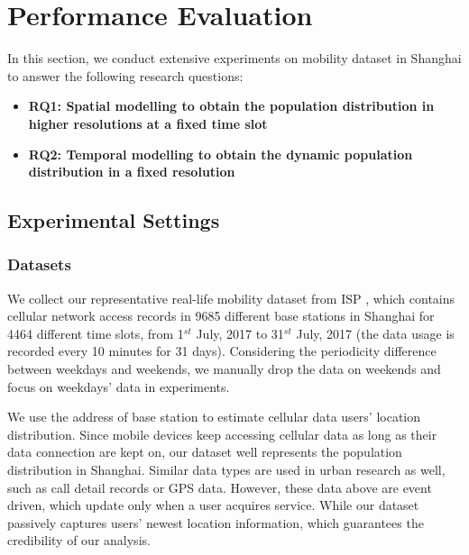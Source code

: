 \documentclass[letterpaper]{article} %
\begin{document}
\section{Performance Evaluation}

In this section, we conduct extensive experiments on mobility dataset in Shanghai to answer the following research questions:

\begin{itemize}

    \item \textbf{RQ1: Spatial modelling to obtain the population distribution in higher resolutions at a fixed time slot} 

    \item \textbf{RQ2: Temporal modelling to obtain the dynamic population distribution in a fixed resolution}

\end{itemize}

\subsection{Experimental Settings}

\subsubsection{Datasets}

We collect our representative real-life mobility dataset from ISP , which contains cellular network access records in 9685 different base stations in Shanghai for 4464 different time slots, from 1$^{st}$ July, 2017 to 31$^{st}$ July, 2017 (the data usage is recorded every 10 minutes for 31 days). Considering the periodicity difference between weekdays and weekends, we manually drop the data on weekends and focus on weekdays' data in experiments. 

We use the address of base station to estimate cellular data users' location distribution. Since mobile devices keep accessing cellular data as long as their data connection are kept on, our dataset well represents the population distribution in Shanghai. Similar data types are used in urban research as well, such as call detail records \cite{isaacman2012human,ficek2012inter} or GPS data\cite{zheng2008understanding}. However, these data above are event driven, which update only when a user acquires service. While our dataset passively captures users' newest location information, which guarantees the credibility of our analysis.
\end{document}
